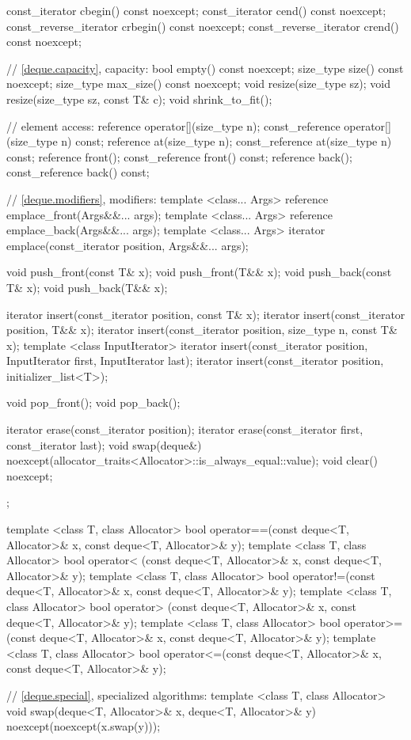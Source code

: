 \begin{codeblock}
{{    const_iterator         cbegin() const noexcept;
    const_iterator         cend() const noexcept;
    const_reverse_iterator crbegin() const noexcept;
    const_reverse_iterator crend() const noexcept;

    // \ref{deque.capacity}, capacity:
    bool      empty() const noexcept;
    size_type size() const noexcept;
    size_type max_size() const noexcept;
    void      resize(size_type sz);
    void      resize(size_type sz, const T& c);
    void      shrink_to_fit();

    // element access:
    reference       operator[](size_type n);
    const_reference operator[](size_type n) const;
    reference       at(size_type n);
    const_reference at(size_type n) const;
    reference       front();
    const_reference front() const;
    reference       back();
    const_reference back() const;

    // \ref{deque.modifiers}, modifiers:
    template <class... Args> reference emplace_front(Args&&... args);
    template <class... Args> reference emplace_back(Args&&... args);
    template <class... Args> iterator emplace(const_iterator position, Args&&... args);

    void push_front(const T& x);
    void push_front(T&& x);
    void push_back(const T& x);
    void push_back(T&& x);

    iterator insert(const_iterator position, const T& x);
    iterator insert(const_iterator position, T&& x);
    iterator insert(const_iterator position, size_type n, const T& x);
    template <class InputIterator>
      iterator insert(const_iterator position, InputIterator first, InputIterator last);
    iterator insert(const_iterator position, initializer_list<T>);

    void pop_front();
    void pop_back();

    iterator erase(const_iterator position);
    iterator erase(const_iterator first, const_iterator last);
    void     swap(deque&)
      noexcept(allocator_traits<Allocator>::is_always_equal::value);
    void     clear() noexcept;
  };

  template <class T, class Allocator>
    bool operator==(const deque<T, Allocator>& x, const deque<T, Allocator>& y);
  template <class T, class Allocator>
    bool operator< (const deque<T, Allocator>& x, const deque<T, Allocator>& y);
  template <class T, class Allocator>
    bool operator!=(const deque<T, Allocator>& x, const deque<T, Allocator>& y);
  template <class T, class Allocator>
    bool operator> (const deque<T, Allocator>& x, const deque<T, Allocator>& y);
  template <class T, class Allocator>
    bool operator>=(const deque<T, Allocator>& x, const deque<T, Allocator>& y);
  template <class T, class Allocator>
    bool operator<=(const deque<T, Allocator>& x, const deque<T, Allocator>& y);

  // \ref{deque.special}, specialized algorithms:
  template <class T, class Allocator>
    void swap(deque<T, Allocator>& x, deque<T, Allocator>& y)
      noexcept(noexcept(x.swap(y)));
}
\end{codeblock}

